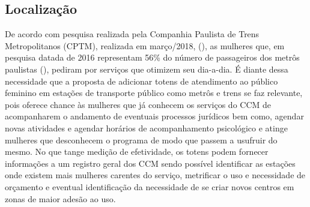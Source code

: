 \subsection{Localização}
De acordo com pesquisa realizada pela Companhia Paulista de Trens Metropolitanos (CPTM), realizada em março/2018, (\cite{cptm-demandas-publico-feminino}), as mulheres que, em pesquisa datada de 2016 representam 56\% do número de passageiros dos metrôs paulistas (\cite{pesquisa-de-caracterizacao-socioeconomica-do-usuario}), pediram por serviços que otimizem seu dia-a-dia. É diante dessa necessidade que a proposta de adicionar totens de atendimento ao público feminino em estações de transporte público como metrôs e trens se faz relevante, pois oferece chance às mulheres que já conhecem os serviços do CCM de acompanharem o andamento de eventuais processos jurídicos bem como, agendar novas atividades e agendar horários de acompanhamento psicológico e atinge mulheres que desconhecem o programa de modo que passem a usufruir do mesmo.
No que tange medição de efetividade, os totens podem fornecer informações a um registro geral dos CCM sendo possível identificar as estações onde existem mais mulheres carentes do serviço, metrificar o uso e necessidade de orçamento e eventual identificação da necessidade de se criar novos centros em zonas de maior adesão ao uso.
\newpage

